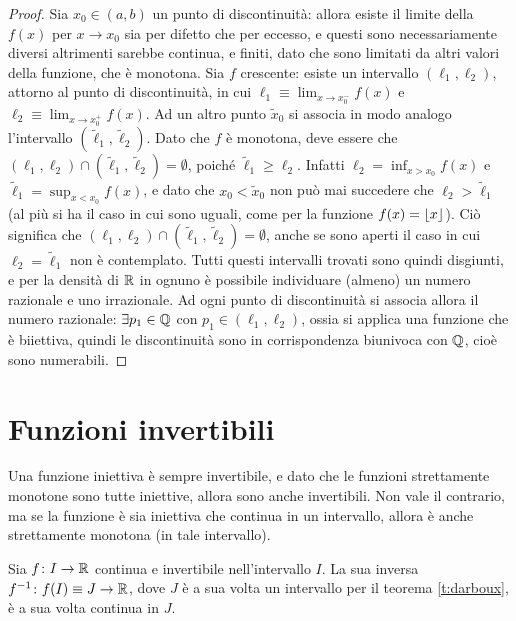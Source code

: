\begin{proof}
Sia $x_0\in(a,b)$ un punto di discontinuità: allora esiste il limite della $f(x)$ per $x\to x_0$ sia per difetto che per eccesso, e questi sono necessariamente diversi altrimenti sarebbe continua, e finiti, dato che sono limitati da altri valori della funzione, che è monotona.
Sia $f$ crescente: esiste un intervallo $(\ell_1,\ell_2)$, attorno al punto di discontinuità, in cui $\ell_1\equiv\lim_{x\to x_0^-}f(x)$ e $\ell_2\equiv\lim_{x\to x_0^+}f(x)$. Ad un altro punto $\tilde{x}_0$ si associa in modo analogo l'intervallo $(\tilde{\ell}_1,\tilde{\ell}_2)$. Dato che $f$ è monotona, deve essere che $(\ell_1,\ell_2)\cap(\tilde{\ell}_1,\tilde{\ell}_2)=\emptyset$, poiché $\tilde{\ell}_1\geq \ell_2$. Infatti $\ell_2=\inf_{x>x_0}f(x)$ e $\tilde{\ell}_1=\sup_{x<x_0}f(x)$, e dato che $x_0<\tilde{x}_0$ non può mai succedere che $\ell_2>\tilde{\ell}_1$ (al più si ha il caso in cui sono uguali, come per la funzione $f(x)=\left\lfloor{x}\right\rfloor$).
Ciò significa che $(\ell_1,\ell_2)\cap(\tilde{\ell}_1,\tilde{\ell}_2)=\emptyset$, anche se sono aperti il caso in cui $\ell_2=\tilde{\ell}_1$ non è contemplato.
Tutti questi intervalli trovati sono quindi disgiunti, e per la densità di $\mathbb{R}$ in ognuno è possibile individuare (almeno) un numero razionale e uno irrazionale. Ad ogni punto di discontinuità si associa allora il numero razionale: $\exists p_1\in\mathbb{Q}$ con $p_1\in(\ell_1,\ell_2)$, ossia si applica una funzione che è biiettiva, quindi le discontinuità sono in corrispondenza biunivoca con $\mathbb{Q}$, cioè sono numerabili.
\end{proof}

\section{Funzioni invertibili}
Una funzione iniettiva è sempre invertibile, e dato che le funzioni strettamente monotone sono tutte iniettive, allora sono anche invertibili. Non vale il contrario, ma se la funzione è sia iniettiva che continua in un intervallo, allora è anche strettamente monotona (in tale intervallo).
\begin{teorema}
Sia $f\colon I\to\mathbb{R}$ continua e invertibile nell'intervallo $I$. La sua inversa $f^{-1}\colon f(I)\equiv J\to\mathbb{R}$, dove $J$ è a sua volta un intervallo per il teorema \ref{t:darboux}, è a sua volta continua in $J$.
\end{teorema}
